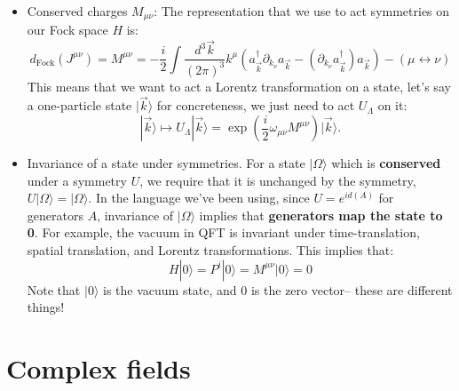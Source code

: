 \documentclass[12pt, oneside]{article}   	%
\theoremstyle{definition}
\begin{document}
\begin{itemize}
	\item Conserved charges $M_{\mu\nu}$: The representation that we use to act symmetries on our Fock space $H$ is:
	\begin{equation}
		d_\mathrm{Fock}(J^{\mu\nu}) = M^{\mu\nu} = -\frac{i}{2} \int \frac{d^3\vec k}{(2\pi)^3} k^\mu \left(a_{\vec k}^\dagger\partial_{k_\nu} a_{\vec k} - (\partial_{k_\nu} a_{\vec k}^\dagger ) a_{\vec k}\right) - (\mu\leftrightarrow\nu)
	\end{equation}
	This means that we want to act a Lorentz transformation on a state, let's say a one-particle state $|\vec k\rangle$ for concreteness, we just need to act $U_\Lambda$ on it:
	\begin{equation}
		|\vec k\rangle\mapsto U_\Lambda |\vec k\rangle = \exp\left(\frac{i}{2} \omega_{\mu\nu} M^{\mu\nu}\right)|\vec k\rangle.
	\end{equation}
	
	\item Invariance of a state under symmetries. For a state $|\Omega\rangle$ which is \textbf{conserved} under a symmetry $U$, we require that it is unchanged by the symmetry, $U |\Omega\rangle = |\Omega\rangle$. In the language we've been using, since $U = e^{i d(A)}$ for generators $A$, invariance of $|\Omega\rangle$ implies that \textbf{generators map the state to 0}. For example, the vacuum in QFT is invariant under time-translation, spatial translation, and Lorentz transformations. This implies that:
	\begin{equation}
		H|0\rangle = P^i|0\rangle = M^{\mu\nu}|0\rangle = 0
	\end{equation}
	Note that $|0\rangle$ is the vacuum state, and $0$ is the zero vector-- these are different things!
	
\end{itemize}

\section*{Complex fields}
\end{document}
